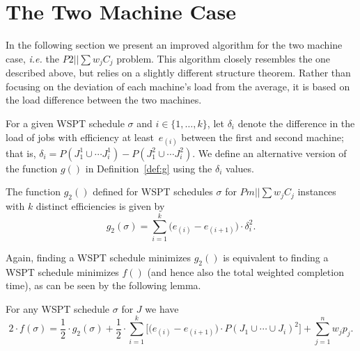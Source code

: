 \documentclass[11pt]{llncs}
\begin{document}
\section{The Two Machine Case}

In the following section we present an improved algorithm for the two machine case, \emph{i.e.} the $P2|| \sum w_j C_j$ problem. This algorithm closely resembles the one described above, but relies on a slightly different structure theorem. Rather than focusing on the deviation of each machine's load from the average, it is based on the load difference between the two machines.

For a given WSPT schedule $\sigma$ and $i \in \{1,\ldots,k\}$, let $\delta_i$ denote  the difference in the load of jobs with efficiency at least~$e_{(i)}$ between the first and second machine; that is, $\delta_i = P(J^1_1 \cup \cdots J^1_i) - P(J^2_1 \cup \cdots J^2_i)$. We define an alternative version of the function $g()$ in Definition~\ref{def:g} using the $\delta_i$ values. 
\begin{definition}
\label{def:g2}
The function $g_2()$ defined for WSPT schedules $\sigma$ for $Pm||\sum w_j C_j$ instances with $k$ distinct efficiencies is given by    
$$
g_2(\sigma) =   %
\sum_{i = 1}^{k}  \big(e_{(i)}-e_{(i+1)}\big)  \cdot \delta^2_i.
$$
\end{definition}

Again, finding a WSPT schedule minimizes $g_2()$ is equivalent to finding a WSPT schedule minimizes $f()$ (and hence also the total weighted completion time), as can be seen by the following lemma.
\begin{lemma}
\label{lem:AlternativeForumlation2}%
For any WSPT schedule $\sigma$ for $J$ we have
$$
2 \cdot f(\sigma) = \frac{1}{2} \cdot g_2(\sigma) + \frac{1}{2} \cdot \sum_{i = 1}^{k}  \Big[ \big(e_{(i)}-e_{(i+1)}\big)  \cdot P(J_1 \cup \cdots \cup J_i)^2 \Big] + \sum^n_{j=1} w_j p_j.
$$
\end{lemma}
\end{document}
